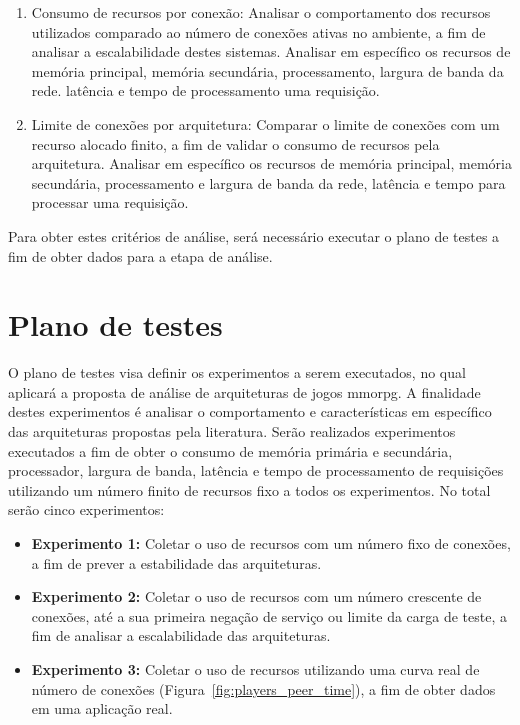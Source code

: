 \begin{enumerate}
  \item Consumo de recursos por conexão: Analisar o comportamento dos recursos utilizados comparado ao número de conexões ativas no ambiente, a fim de analisar a escalabilidade destes sistemas. Analisar em específico os recursos de memória principal, memória secundária, processamento, largura de banda da rede. latência e tempo de processamento uma requisição.
  \item Limite de conexões por arquitetura: Comparar o limite de conexões com um recurso alocado finito, a fim de validar o consumo de recursos pela arquitetura. Analisar em específico os recursos de memória principal, memória secundária, processamento e largura de banda da rede, latência e tempo para processar uma requisição.
\end{enumerate}



Para obter estes critérios de análise, será necessário executar o plano de testes a fim de obter dados para a etapa de análise.



\section{Plano de testes}
\label{testes}



O plano de testes visa definir os experimentos a serem executados, no qual aplicará a proposta de análise de arquiteturas de jogos \ac{mmorpg}.
%
A finalidade destes experimentos é analisar o comportamento e características em específico das arquiteturas propostas pela literatura.
%
Serão realizados experimentos executados a fim de obter o consumo de memória primária e secundária, processador, largura de banda, latência e tempo de processamento de requisições utilizando um número finito de recursos fixo a todos os experimentos.
%
No total serão cinco experimentos:



\begin{itemize}
  \item \textbf{Experimento 1:} Coletar o uso de recursos com um número fixo de conexões, a fim de prever a estabilidade das arquiteturas.
  \item \textbf{Experimento 2:} Coletar o uso de recursos com um número crescente de conexões, até a sua primeira negação de serviço ou limite da carga de teste, a fim de analisar a escalabilidade das arquiteturas.
  \item \textbf{Experimento 3:} Coletar o uso de recursos utilizando uma curva real de número de conexões (Figura~\ref{fig:players_peer_time}), a fim de obter dados em uma aplicação real.
\end{itemize}



